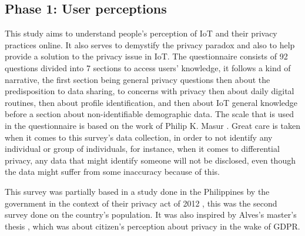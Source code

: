 \documentclass[conference]{IEEEtran}
\begin{document}

\subsection{Phase 1: User perceptions}

This study aims to understand people's perception of IoT and their
privacy practices online. It also serves to demystify the privacy paradox
and also to help provide a solution to the privacy issue in IoT. The questionnaire
consists of 92 questions divided into 7 sections to access users' knowledge,
it follows a kind of narrative, the first section being general privacy
questions then about the predisposition
to data sharing, to concerns with privacy then about daily digital
routines, then about profile identification, and then about IoT general
knowledge before a section about non-identifiable demographic data.
The scale that is used in the questionnaire is based on the work of Philip K.
Masur \cite{masur2018situational}.
Great care is taken when it comes to this survey's data collection, in order
to not identify any individual or group of individuals, for instance, when it
comes to differential privacy, any data that might identify someone will not
be disclosed, even though the data might suffer from some inaccuracy because
of this.

This survey was partially based in a study done in the Philippines
by the government in the context of their privacy act of 2012 \cite{Philippine2022Conduct}, this was the
second survey done on the country's population. It was also inspired by
Alves's master's thesis \cite{alves2021}, which was about citizen's perception about privacy
in the wake of GDPR.
\end{document}
